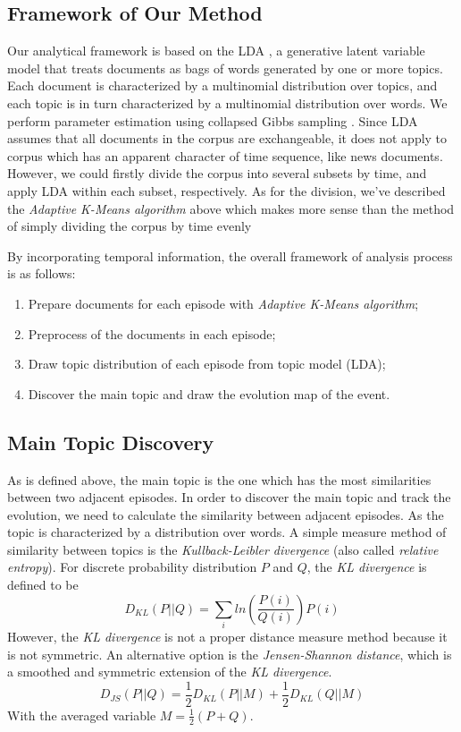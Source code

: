 \documentclass[runningheads,a4paper]{llncs}
\begin{document}
\subsection{Framework of Our Method}
\label{section4.2}
Our analytical framework is based on the LDA \cite{Blei:2003}, a generative latent variable model that treats documents as bags of words generated by one or more topics. Each document is characterized by a multinomial distribution over topics, and each topic is in turn characterized by a multinomial distribution over words. We perform parameter estimation using collapsed Gibbs sampling \cite{griffiths2004finding} \cite{heinrich2005parameter}. Since LDA assumes that all documents in the corpus are exchangeable, it does not apply to corpus which has an apparent character of time sequence, like news documents. However, we could firstly divide the corpus into several subsets by time, and apply LDA within each subset, respectively. As for the division, we've described the \emph{Adaptive K-Means algorithm} above which makes more sense than the method of simply dividing the corpus by time evenly

By incorporating temporal information, the overall framework of analysis process is as follows:
\begin{enumerate}
  \item Prepare documents for each episode with \emph{Adaptive K-Means algorithm};
  \item Preprocess of the documents in each episode;
  \item Draw topic distribution of each episode from topic model (LDA);
  \item Discover the main topic and draw the evolution map of the event.
\end{enumerate}

\subsection{Main Topic Discovery}
\label{section4.3}
As is defined above, the main topic is the one which has the most similarities between two adjacent episodes. In order to discover the main topic and track the evolution, we need to calculate the similarity between adjacent episodes. As the topic is characterized by a distribution over words. A simple measure method of similarity between topics is the \emph{Kullback-Leibler divergence} (also called \emph{relative entropy}). For discrete probability distribution $P$ and $Q$, the \emph{KL divergence} is defined to be
\begin{equation}
D_{KL} \left ( P||Q \right ) = \sum_{i}ln\left ( \frac{P(i)}{Q(i)} \right ) P(i)
\end{equation}
However, the \emph{KL divergence} is not a proper distance measure method because it is not symmetric. An alternative option is the \emph{Jensen-Shannon distance}, which is a smoothed and symmetric extension of the \emph{KL divergence}.
\begin{equation}
D_{JS} \left ( P||Q \right ) = \frac{1}{2} D_{KL} \left ( P||M \right ) + \frac{1}{2} D_{KL} \left ( Q||M \right )
\end{equation}
With the averaged variable $M = \frac{1}{2}(P+Q)$. 
\end{document}
